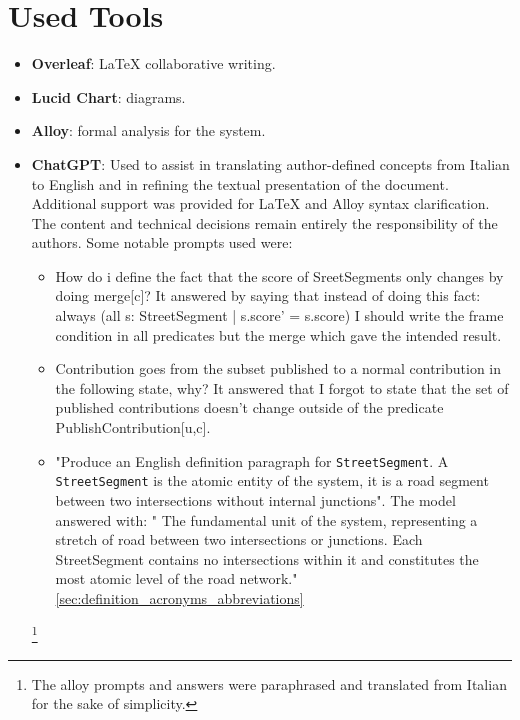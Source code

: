 \section{Used Tools}
\label{sec:used_tools}%

\begin{itemize}
    \item \textbf{Overleaf}: LaTeX collaborative writing.
    \item \textbf{Lucid Chart}: diagrams.
    \item \textbf{Alloy}: formal analysis for the system.
    \item \textbf{ChatGPT}: Used to assist in translating author-defined concepts from Italian to English 
and in refining the textual presentation of the document. 
Additional support was provided for \LaTeX{} and Alloy syntax clarification. 
The content and technical decisions remain entirely the responsibility of the authors.
Some notable prompts used were:
\begin{itemize}
    \item How do i define the fact that the score of SreetSegments only changes by doing merge[c]?
        It answered by saying that instead of doing this fact: always (all s: StreetSegment | s.score' = s.score)
        I should write the frame condition in all predicates but the merge which gave the intended result.
    \item   Contribution goes from the subset published to a normal contribution in the following state, why?
        It answered that I forgot to state that the set of published contributions doesn't change outside of the
        predicate PublishContribution[u,c].
    
    \item "Produce an English definition paragraph for \texttt{StreetSegment}. 
    A \texttt{StreetSegment} is the atomic entity of the system, it is a road segment between two intersections without internal junctions". 
    The model answered with: " The fundamental unit of the system, representing a stretch of road between two intersections or junctions. Each StreetSegment contains no intersections within it and constitutes the most atomic level of the road network."\ref{sec:definition_acronyms_abbreviations}

\end{itemize} 
    
    
\footnote{The alloy prompts and answers were paraphrased and translated from Italian for the sake of simplicity.}

\end{itemize}
